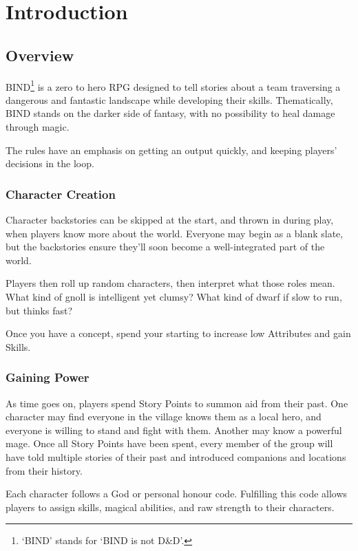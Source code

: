 \chapter*{Introduction}

\section*{Overview}

\begin{multicols}{2}

\noindent
BIND\footnote{`BIND' stands for `BIND is not D\&D'.} is a zero to hero RPG designed to tell stories about a team traversing a dangerous and fantastic landscape while developing their skills.
Thematically, BIND stands on the darker side of fantasy, with no possibility to heal damage through magic.

The rules have an emphasis on getting an output quickly, and keeping players' decisions in the loop.

\subsection*{Character Creation}

Character backstories can be skipped at the start, and thrown in during play, when players know more about the world.
Everyone may begin as a blank slate, but the backstories ensure they'll soon become a well-integrated part of the world.

Players then roll up random characters, then interpret what those roles mean.
What kind of gnoll is intelligent yet clumsy?
What kind of dwarf if slow to run, but thinks fast?

Once you have a concept, spend your starting  to increase low Attributes and gain Skills.

\subsection*{Gaining Power}

As time goes on, players spend Story Points to summon aid from their past.
One character may find everyone in the village knows them as a local hero, and everyone is willing to stand and fight with them.
Another may know a powerful mage.
Once all Story Points have been spent, every member of the group will have told multiple stories of their past and introduced companions and locations from their history.

Each character follows a God or personal honour code.
Fulfilling this code allows players to assign skills, magical abilities, and raw strength to their characters.


\end{multicols}
